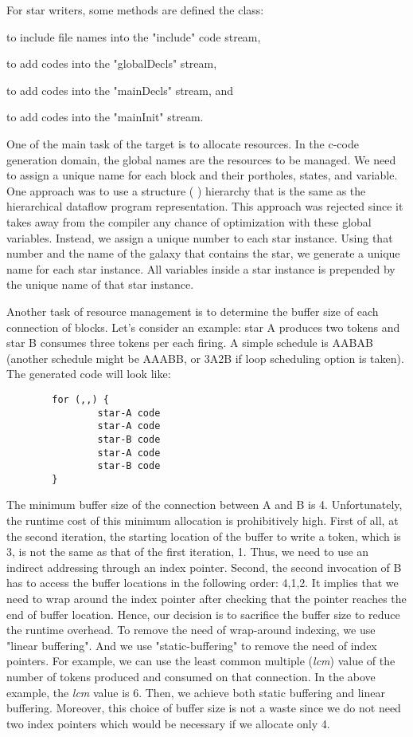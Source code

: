 \begin{ignore}
For star writers, some methods are defined the 
class:

to include file names into the "include" code stream,

to add codes into the "globalDecls" stream,

to add codes into the "mainDecls" stream, and

to add codes into the "mainInit" stream.

One of the main task of the target is to allocate resources. In the c-code
generation domain, the global names are the resources to be managed.
We need to assign a unique name for each block and their portholes, states,
and variable. One approach was to use a structure (
) hierarchy that is the same as the hierarchical dataflow program
representation. This approach was rejected since it takes away from the 
compiler any chance of optimization with these global variables. 
Instead, we assign a unique number to each star instance. Using that number
and the name of the galaxy that contains the star, we generate a unique name
for each star instance. All variables inside a star instance is
prepended by the unique name of that star instance.

Another task of resource management is to determine the buffer size of
each connection of blocks.  Let's consider an example: star A produces
two tokens and star B consumes three tokens per each firing. A simple
schedule is AABAB (another schedule might be AAABB, or 3A2B if loop
scheduling option is taken). The generated code will look like:

\begin{verbatim}
        for (,,) {
                star-A code
                star-A code
                star-B code
                star-A code
                star-B code
        }
\end{verbatim}

The minimum buffer size of the connection
between A and B is 4. Unfortunately, the runtime cost of this 
minimum allocation is prohibitively high. First of all, at the second
iteration,
the starting location of the buffer to write a token, which is 3,
is not the same as that of the first iteration, 1. Thus, we need to
use an indirect addressing through an index pointer. Second, the second
invocation of B has to access the buffer locations in the following order:
4,1,2. It implies that we need to wrap around the index pointer after
checking that the pointer reaches the end of buffer location.
Hence, our decision is to sacrifice the buffer size to reduce the runtime
overhead. To remove the need of wrap-around indexing, we use "linear
buffering". And we use "static-buffering" to remove the need of
index pointers. For example, we can use the least common multiple (\emph{lcm})
value of the number of tokens produced and consumed on that connection.
In the above example, the \emph{lcm} value is 6. Then, we achieve both
static buffering and linear buffering. Moreover, this choice of
buffer size is not a waste since we do not need two index pointers which
would be necessary if we allocate only 4.


\end{ignore}
